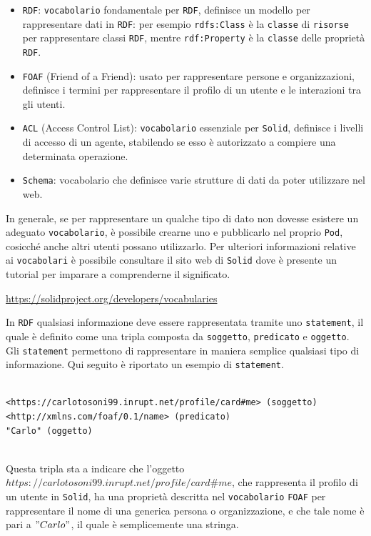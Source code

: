 \begin{itemize}
	\item {\tt RDF}: {\tt vocabolario} fondamentale per {\tt RDF}, definisce un modello per rappresentare dati in {\tt RDF}:
	per esempio {\tt rdfs:Class} è la {\tt classe} di {\tt risorse} per rappresentare classi {\tt RDF}, mentre {\tt rdf:Property} è la {\tt classe} delle proprietà {\tt RDF}.
	\item {\tt FOAF} (Friend of a Friend): usato per rappresentare persone e organizzazioni, definisce i termini per rappresentare il profilo di un utente e le interazioni tra gli utenti.
	\item {\tt ACL} (Access Control List): {\tt vocabolario} essenziale per {\tt Solid}, definisce i livelli di accesso di un agente, stabilendo se esso è autorizzato a compiere una determinata operazione.
	\item {\tt Schema}: vocabolario che definisce varie strutture di dati da poter utilizzare nel web.
\end{itemize}

In generale, se per rappresentare un qualche tipo di dato non dovesse esistere un adeguato {\tt vocabolario}, è possibile crearne uno e pubblicarlo nel proprio {\tt Pod}, cosicché anche altri utenti possano utilizzarlo. Per ulteriori informazioni relative ai {\tt vocabolari} è possibile consultare il sito web di {\tt Solid} dove è presente un tutorial per imparare a comprenderne il significato.

\smallskip

\href{https://solidproject.org/developers/vocabularies}{https://solidproject.org/developers/vocabularies}

\medskip

In {\tt RDF} qualsiasi informazione deve essere rappresentata tramite uno {\tt statement}, il quale è definito come una tripla composta da {\tt soggetto}, {\tt predicato} e {\tt oggetto}. Gli {\tt statement} permettono di rappresentare in maniera semplice qualsiasi tipo di informazione. Qui seguito è riportato un esempio di {\tt statement}.

\medskip
\begin{lstlisting}

<https://carlotosoni99.inrupt.net/profile/card#me> (soggetto)
<http://xmlns.com/foaf/0.1/name> (predicato)
"Carlo" (oggetto)


\end{lstlisting}

\medskip

Questa tripla sta a indicare che l'oggetto\\$https://carlotosoni99.inrupt.net/profile/card\#me$, che rappresenta il profilo di un utente in {\tt Solid}, ha una proprietà descritta nel {\tt vocabolario} {\tt FOAF} per rappresentare il nome di una generica persona o organizzazione, e che tale nome è pari a $"Carlo"$, il quale è semplicemente una stringa.

